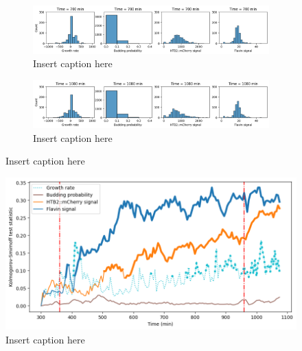 \begin{figure}
  \begin{subfigure}[htpb]{0.9\textwidth}
   \centering
   \includegraphics[width=\textwidth]{613_distribs_0700}
   \caption{
     Insert caption here
   }
   \label{fig:biology-kdeficient-distribs-0700}
  \end{subfigure}

  \begin{subfigure}[htpb]{0.9\textwidth}
   \centering
   \includegraphics[width=\textwidth]{613_distribs_1080}
   \caption{
     Insert caption here
   }
   \label{fig:biology-kdeficient-distribs-1080}
  \end{subfigure}

  \caption{
    Insert caption here
  }
  \label{fig:biology-kdeficient-distribs}
\end{figure}


\begin{figure}
  \centering
  \includegraphics[width=\textwidth]{613_ks_highlight}
  \caption{
    Insert caption here
  }
  \label{fig:biology-kdeficient-ks}
\end{figure}


